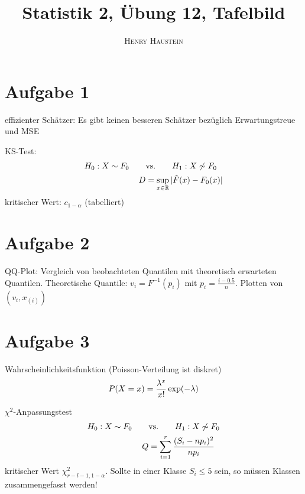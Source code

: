 \documentclass{article}
\title{\textbf{Statistik 2, Übung 12, Tafelbild}}
\author{\textsc{Henry Haustein}}
\date{}
\begin{document}
	\maketitle
	
	\section*{Aufgabe 1}
	effizienter Schätzer: Es gibt keinen besseren Schätzer bezüglich Erwartungstreue und MSE
	
	KS-Test:
	\begin{align}
		H_0: X \sim F_0 \qquad&\text{vs.}\qquad H_1: X \not\sim F_0 \notag \\
		D &= \sup_{x\in\mathbb{R}} \vert \hat{F}(x) - F_0(x)\vert \notag
	\end{align}
	kritischer Wert: $c_{1-\alpha}$ (tabelliert)
	
	\section*{Aufgabe 2}
	QQ-Plot: Vergleich von beobachteten Quantilen mit theoretisch erwarteten Quantilen. Theoretische Quantile: $v_i = F^{-1}(p_i)$ mit $p_i = \frac{i - 0.5}{n}$. Plotten von $(v_i,x_{(i)})$
	
	\section*{Aufgabe 3}
	Wahrscheinlichkeitsfunktion (Poisson-Verteilung ist diskret)
	\begin{align}
		P(X = x) = \frac{\lambda^x}{x!}\exp(-\lambda) \notag
	\end{align}
	
	$\chi^2$-Anpassungstest
	\begin{align}
		H_0: X \sim F_0 \qquad&\text{vs.}\qquad H_1: X \not\sim F_0 \notag \\
		Q &= \sum_{i=1}^r \frac{(S_i - np_i)^2}{np_i} \notag
	\end{align}
	kritischer Wert $\chi^2_{r-l-1,1-\alpha}$. Sollte in einer Klasse $S_i \le 5$ sein, so müssen Klassen zusammengefasst werden!
	
\end{document}
